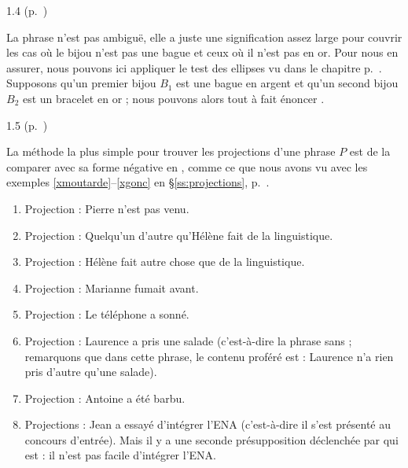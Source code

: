 \begin{Solution}{1.{4}}
(p.~\pageref{exo:1Ambig2})\label{crg:1Ambig2}

La phrase  n'est pas ambiguë, elle a juste une signification assez large pour couvrir les cas où le bijou n'est pas une bague et ceux où il n'est pas en or.  Pour nous en assurer, nous pouvons ici appliquer le test des ellipses vu dans le chapitre p.~\pageref{test:ellipse}.  Supposons qu'un premier bijou $B_1$ est une bague en argent et qu'un second bijou $B_2$ est un bracelet en or ; nous pouvons alors tout à fait énoncer .
\end{Solution}
\begin{Solution}{1.{5}}
 (p.~\pageref{exo:1psp1})

La méthode la plus simple pour trouver les projections d'une
phrase $P$ est de la comparer avec sa forme négative en , comme ce que nous avons vu avec les exemples \ref{xmoutarde}--\ref{xgonc} en \S\ref{ss:projections}, p.~\pageref{p.resNeg}.

\begin{enumerate}
\item %
Projection : Pierre n'est pas venu.

\item %
Projection : Quelqu'un d'autre qu'Hélène fait de la linguistique.

\item %
Projection : Hélène fait autre chose que de la linguistique.

\item %
Projection : Marianne fumait avant.

\item %
Projection : Le téléphone a sonné.

\item %
Projection : Laurence a pris une salade (c'est-à-dire la phrase sans  ;  remarquons que dans cette
phrase, le  contenu proféré est : Laurence n'a rien pris d'autre qu'une
salade).

\item %
Projection : Antoine a été barbu.

\item %
Projections : Jean a essayé d'intégrer l'ENA (c'est-à-dire il s'est présenté au
concours d'entrée).  Mais il y a une seconde présupposition déclenchée par  qui est : il n'est pas facile d'intégrer l'ENA.


\end{enumerate}
\end{Solution}
